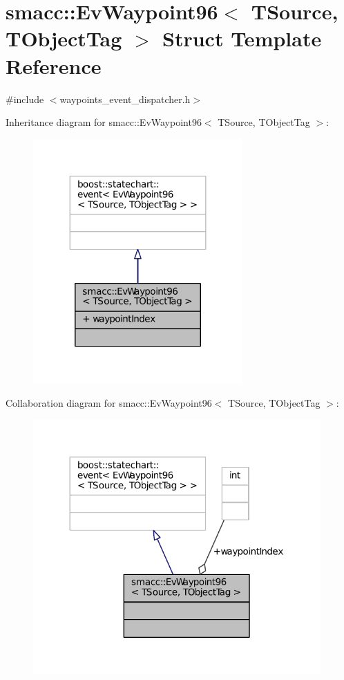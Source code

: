 \hypertarget{structsmacc_1_1EvWaypoint96}{}\section{smacc\+:\+:Ev\+Waypoint96$<$ T\+Source, T\+Object\+Tag $>$ Struct Template Reference}
\label{structsmacc_1_1EvWaypoint96}


{\ttfamily \#include $<$waypoints\+\_\+event\+\_\+dispatcher.\+h$>$}



Inheritance diagram for smacc\+:\+:Ev\+Waypoint96$<$ T\+Source, T\+Object\+Tag $>$\+:
\nopagebreak
\begin{figure}[H]
\begin{center}
\leavevmode
\includegraphics[width=227pt]{structsmacc_1_1EvWaypoint96__inherit__graph}
\end{center}
\end{figure}


Collaboration diagram for smacc\+:\+:Ev\+Waypoint96$<$ T\+Source, T\+Object\+Tag $>$\+:
\nopagebreak
\begin{figure}[H]
\begin{center}
\leavevmode
\includegraphics[width=312pt]{structsmacc_1_1EvWaypoint96__coll__graph}
\end{center}
\end{figure}
